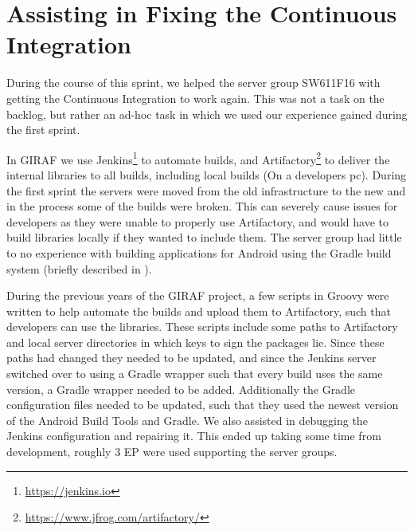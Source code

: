 \section{Assisting in Fixing the Continuous Integration}
During the course of this sprint, we helped the server group SW611F16 with getting the Continuous Integration  to work again. 
This was not a task on the backlog, but rather an ad-hoc task in which we used our experience gained during the first sprint.  

In GIRAF we use Jenkins\footnote{\url{https://jenkins.io}} to automate builds, and Artifactory\footnote{\url{https://www.jfrog.com/artifactory/}} to deliver the internal libraries to all builds, including local builds (On a developers pc). 
During the first sprint the servers were moved from the old infrastructure to the new and in the process some of the builds were broken. 
This can severely cause issues for developers as they were unable to properly use Artifactory, and would have to build libraries locally if they wanted to include them.
The server group had little to no experience with building applications for Android using the Gradle build system (briefly described in ). 

During the previous years of the GIRAF project, a few scripts in Groovy were written to help automate the builds and upload them to Artifactory, such that developers can use the libraries.
These scripts include some paths to Artifactory and local server directories in which keys to sign the packages lie. 
Since these paths had changed they needed to be updated, and since the Jenkins server switched over to using a Gradle wrapper such that every build uses the same version, a Gradle wrapper needed to be added. 
Additionally the Gradle configuration files needed to be updated, such that they used the newest version of the Android Build Tools and Gradle. 
We also assisted in debugging the Jenkins configuration and repairing it. 
This ended up taking some time from development, roughly 3 EP were used supporting the server groups.
